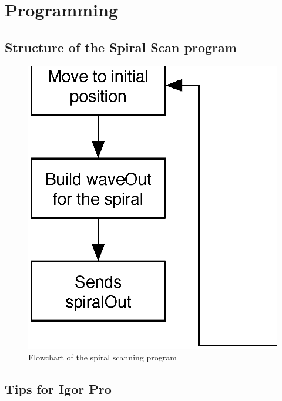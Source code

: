 
\appendix
\chapter{Programming}

\section{Structure of the Spiral Scan program}

\begin{figure}[H]
  \centering
  \includegraphics[scale=0.5]{images/generalprogramflowchart.eps}
    \caption{Flowchart of the spiral scanning program}
  \label{generalprogramflowchart}
\end{figure}






\section{Tips for Igor Pro}
\lipsum[1]
